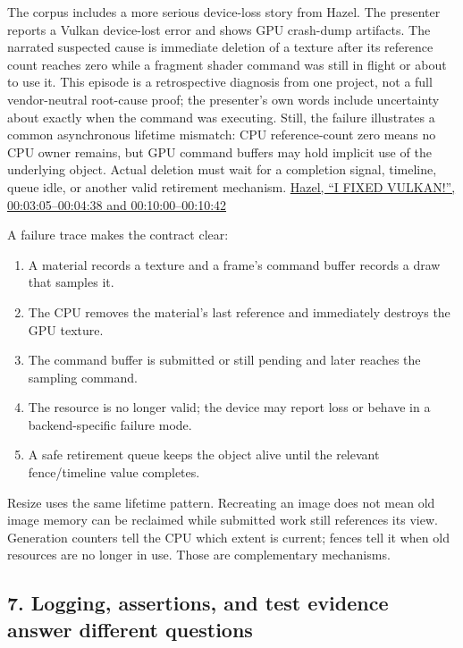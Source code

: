 The corpus includes a more serious device-loss story from Hazel. The presenter reports a Vulkan device-lost error and shows GPU crash-dump artifacts. The narrated suspected cause is immediate deletion of a texture after its reference count reaches zero while a fragment shader command was still in flight or about to use it. This episode is a retrospective diagnosis from one project, not a full vendor-neutral root-cause proof; the presenter's own words include uncertainty about exactly when the command was executing. Still, the failure illustrates a common asynchronous lifetime mismatch: CPU reference-count zero means no CPU owner remains, but GPU command buffers may hold implicit use of the underlying object. Actual deletion must wait for a completion signal, timeline, queue idle, or another valid retirement mechanism. \href{https://www.youtube.com/watch?v=EXgXMa5kapI&t=3m5s}{Hazel, ``I FIXED VULKAN!'', 00:03:05--00:04:38 and 00:10:00--00:10:42}

A failure trace makes the contract clear:

\begin{enumerate}
\def\labelenumi{\arabic{enumi}.}
\tightlist
\item
  A material records a texture and a frame's command buffer records a draw that samples it.
\item
  The CPU removes the material's last reference and immediately destroys the GPU texture.
\item
  The command buffer is submitted or still pending and later reaches the sampling command.
\item
  The resource is no longer valid; the device may report loss or behave in a backend-specific failure mode.
\item
  A safe retirement queue keeps the object alive until the relevant fence/timeline value completes.
\end{enumerate}

Resize uses the same lifetime pattern. Recreating an image does not mean old image memory can be reclaimed while submitted work still references its view. Generation counters tell the CPU which extent is current; fences tell it when old resources are no longer in use. Those are complementary mechanisms.

\subsection{7. Logging, assertions, and test evidence answer different questions}\label{06-engine-ii-ch041-logging-assertions-and-test-evidence-answer-different-questions}

